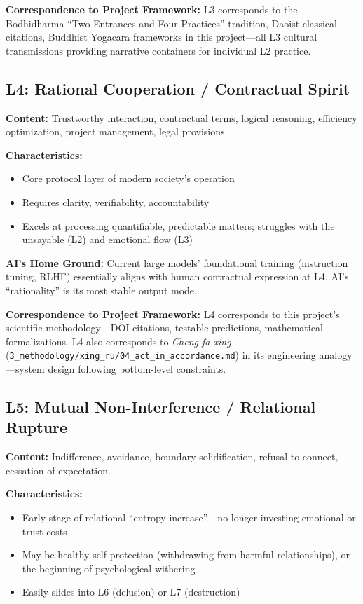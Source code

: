 \documentclass[11pt,a4paper]{article}
\begin{document}
\textbf{Correspondence to Project Framework:} L3 corresponds to the Bodhidharma ``Two Entrances and Four Practices'' tradition, Daoist classical citations, Buddhist Yogacara frameworks in this project---all L3 cultural transmissions providing narrative containers for individual L2 practice.

\subsection{L4: Rational Cooperation / Contractual Spirit}

\textbf{Content:} Trustworthy interaction, contractual terms, logical reasoning, efficiency optimization, project management, legal provisions.

\textbf{Characteristics:}
\begin{itemize}[nosep]
    \item Core protocol layer of modern society's operation
    \item Requires clarity, verifiability, accountability
    \item Excels at processing quantifiable, predictable matters; struggles with the unsayable (L2) and emotional flow (L3)
\end{itemize}

\textbf{AI's Home Ground:} Current large models' foundational training (instruction tuning, RLHF) essentially aligns with human contractual expression at L4. AI's ``rationality'' is its most stable output mode.

\textbf{Correspondence to Project Framework:} L4 corresponds to this project's scientific methodology---DOI citations, testable predictions, mathematical formalizations. L4 also corresponds to \textit{Cheng-fa-xing} (\texttt{3\_methodology/xing\_ru/04\_act\_in\_accordance.md}) in its engineering analogy---system design following bottom-level constraints.

\subsection{L5: Mutual Non-Interference / Relational Rupture}

\textbf{Content:} Indifference, avoidance, boundary solidification, refusal to connect, cessation of expectation.

\textbf{Characteristics:}
\begin{itemize}[nosep]
    \item Early stage of relational ``entropy increase''---no longer investing emotional or trust costs
    \item May be healthy self-protection (withdrawing from harmful relationships), or the beginning of psychological withering
    \item Easily slides into L6 (delusion) or L7 (destruction)
\end{itemize}
\end{document}
